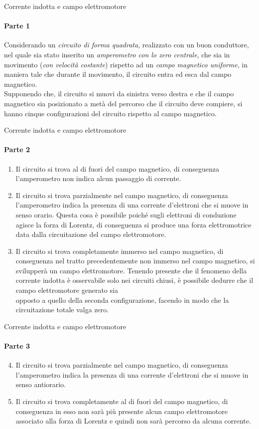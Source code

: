 \documentclass[aspectratio=169]{beamer}
\begin{document}
\begin{frame}{Corrente indotta e campo elettromotore}
	\framesubtitle{Parte 1}
	Considerando un \emph{circuito di forma quadrata}, realizzato con un buon conduttore, nel quale sia stato inserito un \emph{amperometro con lo zero centrale}, che sia in movimento (\emph{con velocità costante}) rispetto ad un \emph{campo magnetico uniforme},  in maniera tale che durante il movimento, il circuito entra ed esca dal campo magnetico.\\
	Supponendo che, il circuito si muovi da sinistra verso destra e che il campo magnetico sia posizionato a metà del percorso che il circuito deve compiere, si hanno cinque configurazioni del circuito rispetto al campo magnetico.\\
	\end{frame}

\begin{frame}{Corrente indotta e campo elettromotore}
	\framesubtitle{Parte 2}
	\begin{enumerate}
	\item Il circuito si trova al di fuori del campo magnetico, di conseguenza l'amperometro non indica alcun passaggio di corrente.
	\item Il circuito si trova parzialmente nel campo magnetico, di conseguenza l'amperometro indica la presenza di una corrente d'elettroni che si muove in senso orario. Questa cosa è possibile poiché sugli elettroni di conduzione agisce la forza di Lorentz, di conseguenza si produce una forza elettromotrice data dalla circuitazione del campo elettromotore.
	\item Il circuito si trova completamente immerso nel campo magnetico, di conseguenza nel tratto precedentemente non immerso nel campo magnetico, si  svilupperà un campo elettromotore. Tenendo presente che il fenomeno della corrente indotta è osservabile solo nei circuiti chiusi, è possibile dedurre che il campo elettromotore generato sia\\ opposto a quello della seconda configurazione, facendo in modo che la\\ circuitazione totale valga zero.
\end{enumerate}
	\end{frame}

\begin{frame}{Corrente indotta e campo elettromotore}
	\framesubtitle{Parte 3}
	\begin{enumerate}
		\setcounter{enumi}{3}
		\item Il circuito si trova parzialmente nel campo magnetico, di conseguenza l'amperometro indica la presenza di una corrente d'elettroni che si muove in senso antiorario. 
		\item Il circuito si trova completamente al di fuori del campo magnetico, di conseguenza in esso non sarà più presente alcun campo elettromotore associato alla forza di Lorentz e quindi non sarà percorso da alcuna corrente.
	\end{enumerate}
\end{frame}
\end{document}
